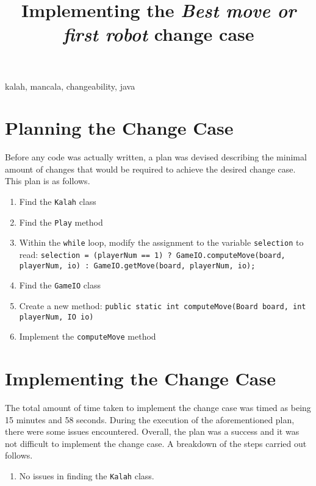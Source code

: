 \documentclass[10pt, a4paper, conference]{IEEEtran}
\begin{document}
\title{Implementing the \textit{Best move or first robot} change case}

\author{
}

\maketitle

\begin{abstract}
\end{abstract}

\begin{IEEEkeywords}
kalah, mancala, changeability, java
\end{IEEEkeywords}

\section{Planning the Change Case}
Before any code was actually written, a plan was devised describing the minimal
amount of changes that would be required to achieve the desired change case.
This plan is as follows.
\begin{enumerate}
  \item Find the \texttt{Kalah} class
  \item Find the \texttt{Play} method
  \item Within the \texttt{while} loop, modify the assignment to the variable
    \texttt{selection} to read: \texttt{selection = (playerNum == 1)
    ? GameIO.computeMove(board, playerNum, io) : GameIO.getMove(board, playerNum, io);}
  \item Find the \texttt{GameIO} class
  \item Create a new method: \texttt{public static int computeMove(Board board,
    int playerNum, IO io)}
  \item Implement the \texttt{computeMove} method
\end{enumerate}

\section{Implementing the Change Case}
The total amount of time taken to implement the change case was timed as being 
15 minutes and 58 seconds. During the execution of the aforementioned plan, there were some
issues encountered. Overall, the plan was a success and it was not difficult to
implement the change case. A breakdown of the steps carried out follows. 
\begin{enumerate}
  \item No issues in finding the \texttt{Kalah} class.
\end{enumerate}
\end{document}
